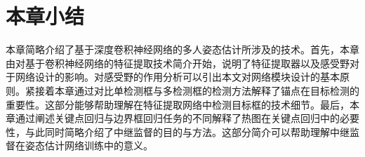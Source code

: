 \section{本章小结}
本章简略介绍了基于深度卷积神经网络的多人姿态估计所涉及的技术。首先，本章由对基于卷积神经网络的特征提取技术简介开始，说明了特征提取器以及感受野对于网络设计的影响。对感受野的作用分析可以引出本文对网络模块设计的基本原则。紧接着本章通过对比单检测框与多检测框的检测方法解释了锚点在目标检测的重要性。这部分能够帮助理解在特征提取网络中检测目标框的技术细节。最后，本章通过阐述关键点回归与边界框回归任务的不同解释了热图在关键点回归中的必要性，与此同时简略介绍了中继监督的目的与方法。这部分简介可以帮助理解中继监督在姿态估计网络训练中的意义。
